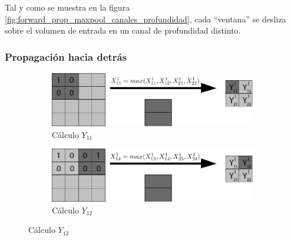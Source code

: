Tal y como se muestra en la figura \ref{fig:forward_prop_maxpool_canales_profundidad}, cada ``ventana'' se desliza sobre el volumen de entrada en un canal de profundidad distinto.

\subsubsection{Propagación hacia detrás}

\begin{figure}[H]
	\centering
	\begin{subfigure}{.5\textwidth}
		\hspace{-10mm}
		\includegraphics[width=1.2\linewidth]{imagenes/back_maxpool_1.jpg}  
		\caption{Cálculo $Y_{11}$}
	\end{subfigure}%
	\begin{subfigure}{.5\textwidth}
		\hspace{10mm}
		\includegraphics[width=1.2\linewidth]{imagenes/back_maxpool_2.jpg}  
		\caption{Cálculo $Y_{12}$}
	\end{subfigure}
	

\end{figure}
